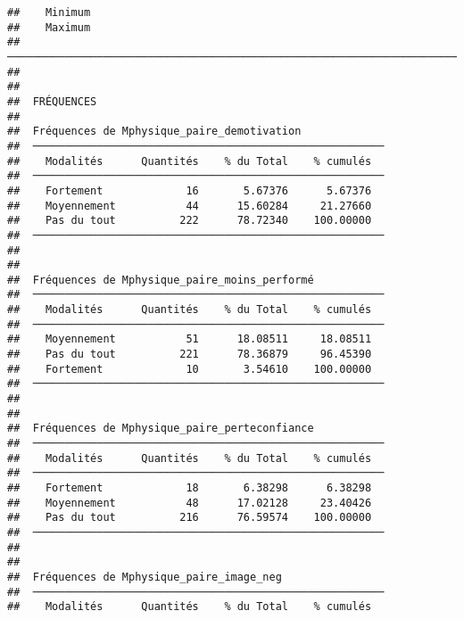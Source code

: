 \documentclass[
]{article}
\begin{document}
\begin{verbatim}
##    Minimum                                                                                                                                                                                                                                                                                                        
##    Maximum                                                                                                                                                                                                                                                                                                        
##  ──────────────────────────────────────────────────────────────────────────────────────────────────────────────────────────────────────────────────────────────────────────────────────────────────────────────────────────────────────────────────────────────────────────────────────────────────────────────── 
## 
## 
##  FRÉQUENCES
## 
##  Fréquences de Mphysique_paire_demotivation              
##  ─────────────────────────────────────────────────────── 
##    Modalités      Quantités    % du Total    % cumulés   
##  ─────────────────────────────────────────────────────── 
##    Fortement             16       5.67376      5.67376   
##    Moyennement           44      15.60284     21.27660   
##    Pas du tout          222      78.72340    100.00000   
##  ─────────────────────────────────────────────────────── 
## 
## 
##  Fréquences de Mphysique_paire_moins_performé            
##  ─────────────────────────────────────────────────────── 
##    Modalités      Quantités    % du Total    % cumulés   
##  ─────────────────────────────────────────────────────── 
##    Moyennement           51      18.08511     18.08511   
##    Pas du tout          221      78.36879     96.45390   
##    Fortement             10       3.54610    100.00000   
##  ─────────────────────────────────────────────────────── 
## 
## 
##  Fréquences de Mphysique_paire_perteconfiance            
##  ─────────────────────────────────────────────────────── 
##    Modalités      Quantités    % du Total    % cumulés   
##  ─────────────────────────────────────────────────────── 
##    Fortement             18       6.38298      6.38298   
##    Moyennement           48      17.02128     23.40426   
##    Pas du tout          216      76.59574    100.00000   
##  ─────────────────────────────────────────────────────── 
## 
## 
##  Fréquences de Mphysique_paire_image_neg                 
##  ─────────────────────────────────────────────────────── 
##    Modalités      Quantités    % du Total    % cumulés   

\end{verbatim}
\end{document}
